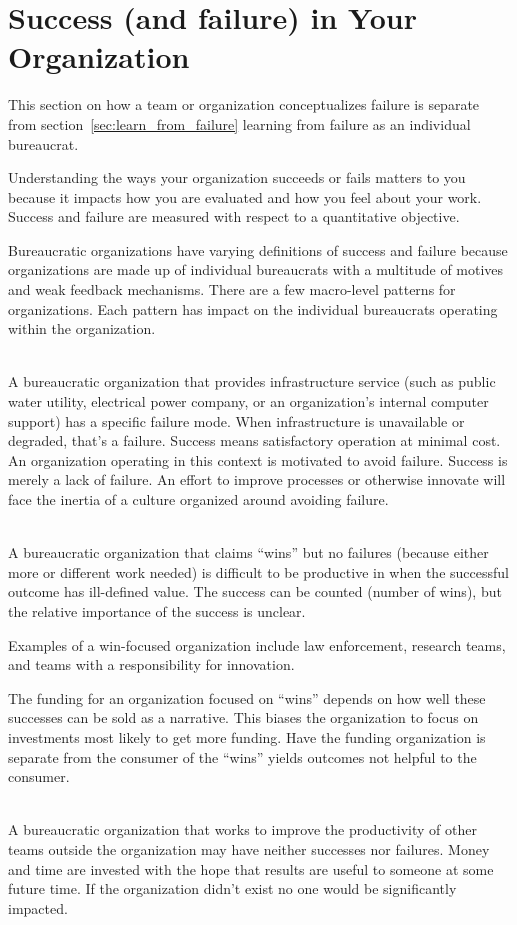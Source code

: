 \section{Success (and failure) in Your Organization\label{sec:org_failure_and_success}}

This section on how a team or organization conceptualizes failure is separate from section~\ref{sec:learn_from_failure} learning from failure as an individual bureaucrat. 

Understanding the ways your organization succeeds or fails matters to you because it impacts how you are evaluated and how you feel about your work. Success and failure are measured with respect to a quantitative objective. 


Bureaucratic organizations have varying definitions of success and failure because organizations are made up of individual bureaucrats with a multitude of motives and weak feedback mechanisms. There are a few macro-level patterns for organizations. Each pattern has impact on the individual bureaucrats operating within the organization. 

\ \\

A bureaucratic organization that provides infrastructure service (such as public water utility, electrical power company, or an organization's internal computer support) has a specific failure mode. When infrastructure is unavailable or degraded, that's a failure. Success means satisfactory operation at minimal cost. An organization operating in this context is motivated to avoid failure. Success is merely a lack of failure. An effort to improve processes or otherwise innovate will face the inertia of a culture organized around avoiding failure. 

\ \\

A bureaucratic organization that claims ``wins'' but no failures (because either more or different work needed) is difficult to be productive in when the successful outcome has ill-defined value. The success can be counted (number of wins), but the relative importance of the success is unclear.

Examples of a win-focused organization include law enforcement, research teams, and teams with a responsibility for innovation. 

The funding for an organization focused on ``wins'' depends on how well these successes can be sold as a narrative. This biases the organization to focus on investments most likely to get more funding. Have the funding organization is separate from the consumer of the ``wins'' yields outcomes not helpful to the consumer.

\ \\

A bureaucratic organization that works to improve the productivity of other teams outside the organization may have neither successes nor failures. Money and time are invested with the hope that results are useful to someone at some future time. If the organization didn't exist no one would be significantly impacted. 